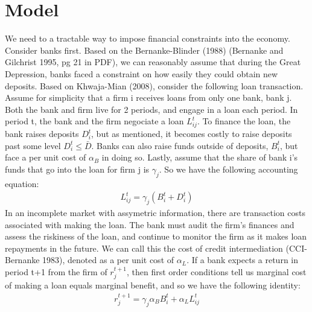 \documentclass[letter,11pt]{article}
\begin{document}
\section{Model}
We need to a tractable way to impose financial constraints into the economy. Consider banks first. Based on the Bernanke-Blinder (1988) (Bernanke and Gilchrist 1995, pg 21 in PDF), we can reasonably assume that during the Great Depression, banks faced a constraint on how easily they could obtain new deposits. Based on Khwaja-Mian (2008), consider the following loan transaction. Assume for simplicity that a firm i receives loans from only one bank, bank j. Both the bank and firm live for 2 periods, and engage in a loan each period. In period t, the bank and the firm negociate a loan $L_{ij}^t$. To finance the loan, the bank raises deposits $D_i^t$, but as mentioned, it becomes costly to raise deposits past some level $D_i^t \leq \bar{D}$. Banks can also raise funds outside of deposits, $B_i^t$, but face a per unit cost of $\alpha_B$ in doing so. Lastly, assume that the share of bank i's funds that go into the loan for firm j is $\gamma_j$. So we have the following accounting equation:
\begin{align}
L_{ij}^t = \gamma_j (B_i^t + D_i^t)
\end{align}
In an incomplete market with assymetric information, there are transaction costs associated with making the loan. The bank must audit the firm's finances and assess the riskiness of the loan, and continue to monitor the firm as it makes loan repayments in the future. We can call this the cost of credit intermediation (CCI-Bernanke 1983), denoted as a per unit cost of $\alpha_L$. If a bank expects a return in period t+1 from the firm of $r_j^{t+1}$, then first order conditions tell us marginal cost of making a loan equals marginal benefit, and so we have the following identity:
\begin{align}
r_j^{t+1} = \gamma_j \alpha_B B_i^t + \alpha_L L_{ij}^t
\end{align}
\end{document}
